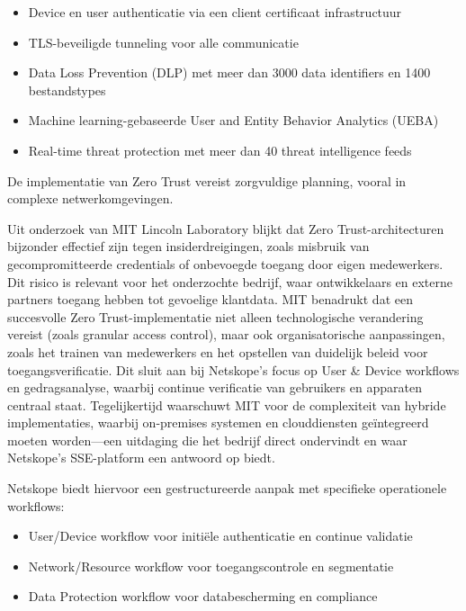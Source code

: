 \begin{itemize}
  \item Device en user authenticatie via een client certificaat infrastructuur
  \item TLS-beveiligde tunneling voor alle communicatie
  \item Data Loss Prevention (DLP) met meer dan 3000 data identifiers en 1400 bestandstypes
  \item Machine learning-gebaseerde User and Entity Behavior Analytics (UEBA)
  \item Real-time threat protection met meer dan 40 threat intelligence feeds
\end{itemize}

De implementatie van Zero Trust vereist zorgvuldige planning, vooral in complexe netwerkomgevingen.

Uit onderzoek van MIT Lincoln Laboratory blijkt dat Zero Trust-architecturen bijzonder effectief zijn tegen insiderdreigingen, zoals misbruik van gecompromitteerde credentials of onbevoegde toegang door eigen medewerkers. 
Dit risico is relevant voor het onderzochte bedrijf, waar ontwikkelaars en externe partners toegang hebben tot gevoelige klantdata. 
MIT benadrukt dat een succesvolle Zero Trust-implementatie niet alleen technologische verandering vereist (zoals granular access control), maar ook organisatorische aanpassingen, zoals het trainen van medewerkers en het opstellen van duidelijk beleid voor toegangsverificatie. 
Dit sluit aan bij Netskope’s focus op User \& Device workflows en gedragsanalyse, waarbij continue verificatie van gebruikers en apparaten centraal staat. 
Tegelijkertijd waarschuwt MIT voor de complexiteit van hybride implementaties, waarbij on-premises systemen en clouddiensten geïntegreerd moeten worden—een uitdaging die het bedrijf direct ondervindt en waar Netskope’s SSE-platform een antwoord op biedt.~\autocite{MIT2022}

Netskope biedt hiervoor een gestructureerde aanpak met specifieke operationele workflows:

\begin{itemize}
  \item User/Device workflow voor initiële authenticatie en continue validatie
  \item Network/Resource workflow voor toegangscontrole en segmentatie
  \item Data Protection workflow voor databescherming en compliance
\end{itemize}

